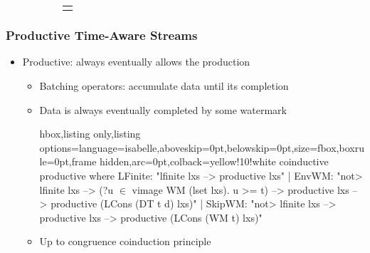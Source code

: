 \documentclass[aspectratio=169,10pt]{beamer}
\begin{document}
\begin{frame}[fragile]
\begin{figure}[!t]
\begin{subfigure}{.5\textwidth}
\begin{tabular}{@{}l@{}}
\begin{tikzpicture}[scale=0.9, every node/.style={scale=0.9},background rectangle/.style={fill=yellow!10!white},show background rectangle]
        \end{tikzpicture}
      \end{tabular}
      \label{fig:stream_example_1}
    \end{subfigure}
    \begin{subfigure}{.38\textwidth}
      \label{fig:diamond_order}
    \vspace*{-2ex}
  \end{subfigure}
  \end{figure}
\end{frame}


\begin{frame}[fragile]
  \frametitle{Productive Time-Aware Streams}
  \begin{itemize}
    \item Productive: always eventually allows the production
          \pause
          \begin{itemize}
            \item Batching operators: accumulate data until its completion
          \pause
            \item Data is always eventually completed by some watermark
\vspace*{-1ex}
\begin{tcblisting}{hbox,listing only,listing options={language=isabelle,aboveskip=0pt,belowskip=0pt},size=fbox,boxrule=0pt,frame hidden,arc=0pt,colback=yellow!10!white}
coinductive productive where
  LFinite: "lfinite lxs --> productive lxs"
| EnvWM: "\<not> lfinite lxs --> (?u $\in$ vimage WM (lset lxs). u >= t) -->
   productive lxs --> productive (LCons (DT t d) lxs)"
| SkipWM: "\<not> lfinite lxs --> productive lxs -->
   productive (LCons (WM t) lxs)"
\end{tcblisting}
\vspace*{-1ex}
          \pause
          \item Up to congruence coinduction principle
          \end{itemize}
  \end{itemize}
\end{frame}
\end{document}

